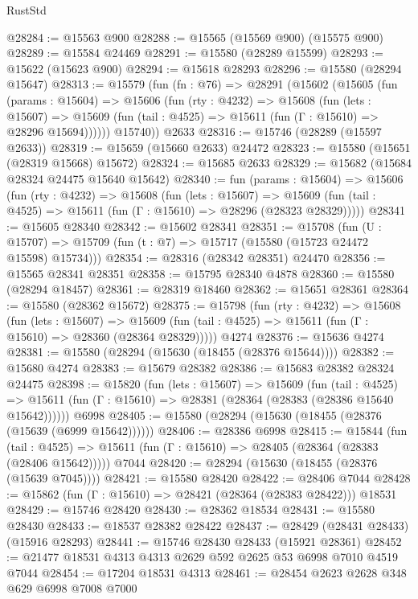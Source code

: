 \begin{lexlean}{RustStd}
\begin{coremodule}
@28284 := @15563 @900
@28288 := @15565 (@15569 @900) (@15575 @900)
@28289 := @15584 @24469
@28291 := @15580 (@28289 @15599)
@28293 := @15622 (@15623 @900)
@28294 := @15618 @28293
@28296 := @15580 (@28294 @15647)
@28313 := @15579
    (fun (fn : @76) =>
    @28291
      (@15602
        (@15605
          (fun (params : @15604) =>
          @15606
            (fun (rty : @4232) =>
            @15608
              (fun (lets : @15607) =>
              @15609 (fun (tail : @4525) => @15611 (fun (Γ : @15610) => @28296 @15694))))))
        @15740))
    @2633
@28316 := @15746 (@28289 (@15597 @2633))
@28319 := @15659 (@15660 @2633) @24472
@28323 := @15580 (@15651 (@28319 @15668) @15672)
@28324 := @15685 @2633
@28329 := @15682 (@15684 @28324 @24475 @15640 @15642)
@28340 := fun (params : @15604) =>
  @15606
    (fun (rty : @4232) =>
    @15608
      (fun (lets : @15607) =>
      @15609 (fun (tail : @4525) => @15611 (fun (Γ : @15610) => @28296 (@28323 @28329)))))
@28341 := @15605 @28340
@28342 := @15602 @28341
@28351 := @15708
    (fun (U : @15707) => @15709 (fun (t : @7) => @15717 (@15580 (@15723 @24472 @15598) @15734)))
@28354 := @28316 (@28342 @28351) @24470
@28356 := @15565 @28341 @28351
@28358 := @15795 @28340 @4878
@28360 := @15580 (@28294 @18457)
@28361 := @28319 @18460
@28362 := @15651 @28361
@28364 := @15580 (@28362 @15672)
@28375 := @15798
    (fun (rty : @4232) =>
    @15608
      (fun (lets : @15607) =>
      @15609 (fun (tail : @4525) => @15611 (fun (Γ : @15610) => @28360 (@28364 @28329)))))
    @4274
@28376 := @15636 @4274
@28381 := @15580 (@28294 (@15630 (@18455 (@28376 @15644))))
@28382 := @15680 @4274
@28383 := @15679 @28382
@28386 := @15683 @28382 @28324 @24475
@28398 := @15820
    (fun (lets : @15607) =>
    @15609
      (fun (tail : @4525) =>
      @15611 (fun (Γ : @15610) => @28381 (@28364 (@28383 (@28386 @15640 @15642))))))
    @6998
@28405 := @15580 (@28294 (@15630 (@18455 (@28376 (@15639 (@6999 @15642))))))
@28406 := @28386 @6998
@28415 := @15844
    (fun (tail : @4525) => @15611 (fun (Γ : @15610) => @28405 (@28364 (@28383 (@28406 @15642)))))
    @7044
@28420 := @28294 (@15630 (@18455 (@28376 (@15639 @7045))))
@28421 := @15580 @28420
@28422 := @28406 @7044
@28428 := @15862 (fun (Γ : @15610) => @28421 (@28364 (@28383 @28422))) @18531
@28429 := @15746 @28420
@28430 := @28362 @18534
@28431 := @15580 @28430
@28433 := @18537 @28382 @28422
@28437 := @28429 (@28431 @28433) (@15916 @28293)
@28441 := @15746 @28430 @28433 (@15921 @28361)
@28452 := @21477 @18531 @4313 @4313 @2629 @592 @2625 @53 @6998 @7010 @4519 @7044
@28454 := @17204 @18531 @4313
@28461 := @28454 @2623 @2628 @348 @629 @6998 @7008 @7000

\end{coremodule}
\end{lexlean}

